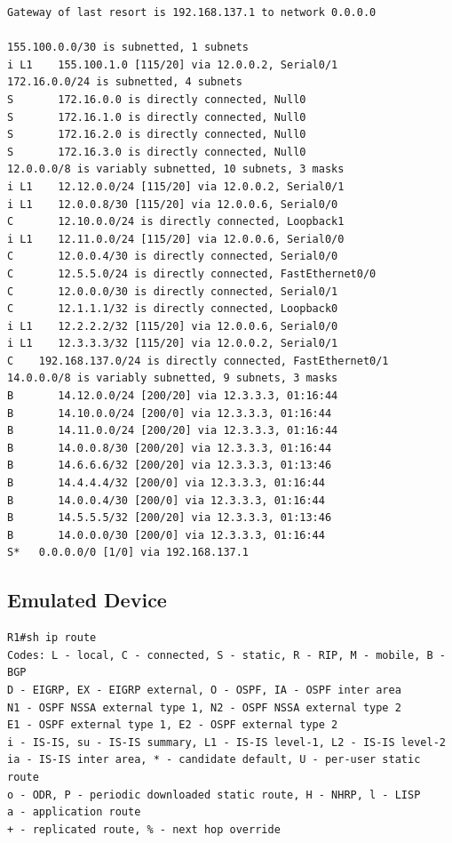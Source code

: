 \documentclass[11pt]{report}
\begin{document}
\begin{appendices}
\begin{lstlisting}
Gateway of last resort is 192.168.137.1 to network 0.0.0.0

155.100.0.0/30 is subnetted, 1 subnets
i L1    155.100.1.0 [115/20] via 12.0.0.2, Serial0/1
172.16.0.0/24 is subnetted, 4 subnets
S       172.16.0.0 is directly connected, Null0
S       172.16.1.0 is directly connected, Null0
S       172.16.2.0 is directly connected, Null0
S       172.16.3.0 is directly connected, Null0
12.0.0.0/8 is variably subnetted, 10 subnets, 3 masks
i L1    12.12.0.0/24 [115/20] via 12.0.0.2, Serial0/1
i L1    12.0.0.8/30 [115/20] via 12.0.0.6, Serial0/0
C       12.10.0.0/24 is directly connected, Loopback1
i L1    12.11.0.0/24 [115/20] via 12.0.0.6, Serial0/0
C       12.0.0.4/30 is directly connected, Serial0/0
C       12.5.5.0/24 is directly connected, FastEthernet0/0
C       12.0.0.0/30 is directly connected, Serial0/1
C       12.1.1.1/32 is directly connected, Loopback0
i L1    12.2.2.2/32 [115/20] via 12.0.0.6, Serial0/0
i L1    12.3.3.3/32 [115/20] via 12.0.0.2, Serial0/1
C    192.168.137.0/24 is directly connected, FastEthernet0/1
14.0.0.0/8 is variably subnetted, 9 subnets, 3 masks
B       14.12.0.0/24 [200/20] via 12.3.3.3, 01:16:44
B       14.10.0.0/24 [200/0] via 12.3.3.3, 01:16:44
B       14.11.0.0/24 [200/20] via 12.3.3.3, 01:16:44
B       14.0.0.8/30 [200/20] via 12.3.3.3, 01:16:44
B       14.6.6.6/32 [200/20] via 12.3.3.3, 01:13:46
B       14.4.4.4/32 [200/0] via 12.3.3.3, 01:16:44
B       14.0.0.4/30 [200/0] via 12.3.3.3, 01:16:44
B       14.5.5.5/32 [200/20] via 12.3.3.3, 01:13:46
B       14.0.0.0/30 [200/0] via 12.3.3.3, 01:16:44
S*   0.0.0.0/0 [1/0] via 192.168.137.1
\end{lstlisting}

\subsection{Emulated Device}

\begin{lstlisting}
R1#sh ip route
Codes: L - local, C - connected, S - static, R - RIP, M - mobile, B - BGP
D - EIGRP, EX - EIGRP external, O - OSPF, IA - OSPF inter area
N1 - OSPF NSSA external type 1, N2 - OSPF NSSA external type 2
E1 - OSPF external type 1, E2 - OSPF external type 2
i - IS-IS, su - IS-IS summary, L1 - IS-IS level-1, L2 - IS-IS level-2
ia - IS-IS inter area, * - candidate default, U - per-user static route
o - ODR, P - periodic downloaded static route, H - NHRP, l - LISP
a - application route
+ - replicated route, % - next hop override


\end{lstlisting}
\end{appendices}
\end{document}
